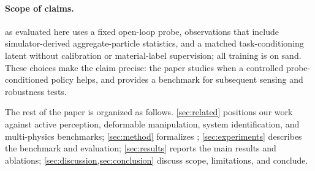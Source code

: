 \paragraph{Scope of claims.}
\PTA{} as evaluated here uses a fixed open-loop probe, observations that include simulator-derived aggregate-particle statistics, and a matched task-conditioning latent without calibration or material-label supervision; all training is on sand. These choices make the claim precise: the paper studies when a controlled probe-conditioned policy helps, and provides a benchmark for subsequent sensing and robustness tests.

The rest of the paper is organized as follows. \cref{sec:related} positions our work against active perception, deformable manipulation, system identification, and multi-physics benchmarks; \cref{sec:method} formalizes \PTA{}; \cref{sec:experiments} describes the benchmark and evaluation; \cref{sec:results} reports the main results and ablations; \cref{sec:discussion,sec:conclusion} discuss scope, limitations, and conclude.
